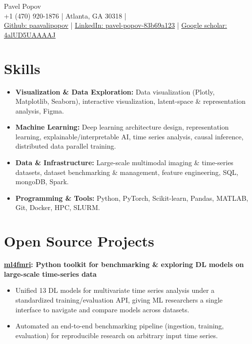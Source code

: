 \documentclass[11pt,a4paper]{article}
\begin{document}
\begin{center}
  {\Huge Pavel Popov}\\[0.5em]
  {\footnotesize +1 (470) 920-1876 \quad | \quad Atlanta, GA 30318} \quad | \\
  {\small \href{https://github.com/paavalipopov}{Github: paavalipopov} \quad | \quad
  \href{https://www.linkedin.com/in/pavel-popov-83b69a123/}{LinkedIn: pavel-popov-83b69a123} \quad | \quad
  \href{https://scholar.google.com/citations?user=4alUD5UAAAAJ}{Google scholar: 4alUD5UAAAAJ}}
\end{center}

\section*{Skills}
\begin{itemize}
[leftmargin=*,noitemsep]
\item \textbf{Visualization \& Data Exploration:} Data visualization (Plotly, Matplotlib, Seaborn), interactive visualization, latent-space \& representation analysis, Figma.
\item \textbf{Machine Learning:} Deep learning architecture design, representation learning, explainable/interpretable AI, time series analysis, causal inference, distributed data parallel training.
\item \textbf{Data \& Infrastructure:} Large-scale multimodal imaging \& time-series datasets, dataset benchmarking \& management, feature engineering, SQL, mongoDB, Spark.
\item \textbf{Programming \& Tools:} Python, PyTorch, Scikit-learn, Pandas, MATLAB, Git, Docker, HPC, SLURM.
\end{itemize}

\section*{Open Source Projects}
\noindent\textbf{\href{https://pypi.org/project/ml4fmri/}{ml4fmri}: Python toolkit for benchmarking \& exploring DL models on large-scale time-series data}\\
[-2em]
\begin{itemize}[leftmargin=*,noitemsep]
    \item Unified 13 DL models for multivariate time series analysis under a standardized training/evaluation API, giving ML researchers a single interface to navigate and compare models across datasets.
    \item Automated an end-to-end benchmarking pipeline (ingestion, training, evaluation) for reproducible research on arbitrary input time series.
\end{itemize}
\end{document}
